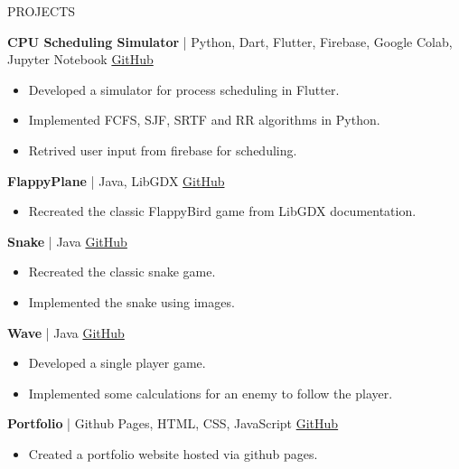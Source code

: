 \documentclass{resume} %
\begin{document}
\begin{rSection}{PROJECTS}
\vspace{-1.25em}
\item \textbf{CPU Scheduling Simulator} | {Python, Dart, Flutter, Firebase, Google Colab, Jupyter Notebook} \hfill \href{https://github.com/JayNakum/OperatingSystemsProject}{GitHub}
\begin{itemize}
    \itemsep -3pt {} 
    \item Developed a simulator for process scheduling in Flutter.
    \item Implemented FCFS, SJF, SRTF and RR algorithms in Python.
    \item Retrived user input from firebase for scheduling.
 \end{itemize}
\item \textbf{FlappyPlane} | {Java, LibGDX} \hfill \href{https://github.com/JayNakum/FlappyPlane}{GitHub}
\begin{itemize}
    \itemsep -3pt {} 
    \item Recreated the classic FlappyBird game from LibGDX documentation.
 \end{itemize}
\item \textbf{Snake} | {Java} \hfill \href{https://github.com/JayNakum/Snake}{GitHub}
\begin{itemize}
    \itemsep -3pt {} 
    \item Recreated the classic snake game.
    \item Implemented the snake using images.
 \end{itemize}
\item \textbf{Wave} | {Java} \hfill \href{https://github.com/JayNakum/Wave}{GitHub}
\begin{itemize}
    \itemsep -3pt {} 
    \item Developed a single player game.
    \item Implemented some calculations for an enemy to follow the player.
 \end{itemize}
\item \textbf{Portfolio} | {Github Pages, HTML, CSS, JavaScript} \hfill \href{https://github.com/JayNakum/JayNakum.github.io}{GitHub}
\begin{itemize}
    \itemsep -3pt {} 
    \item Created a portfolio website hosted via github pages.

\end{itemize}
\end{rSection}
\end{document}
